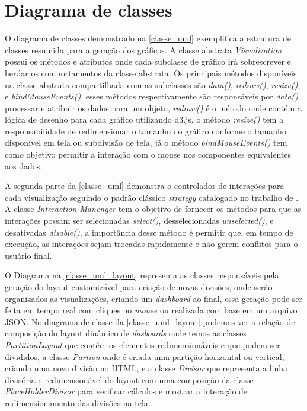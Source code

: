 \documentclass[
	12pt,				%
	openright,			%
	oneside,			%
	a4paper,			%
	english,			%
	brazil				%
	]{abntex2}
\begin{document}
\section{Diagrama de classes}
O diagrama de classes demonstrado na \autoref{classe_uml} exemplifica a estrutura de classes resumida para a geração dos gráficos. A classe abstrata \textit{Visualization}  possui os métodos e atributos onde cada subclasse de gráfico irá sobrescrever e herdar os comportamentos da classe abstrata. Os principais métodos disponíveis na classe abstrata compartilhada com as subclasses são  \textit{data()},  \textit{redraw()},  \textit{resize()}, e \textit{bindMouseEvents()}, esses métodos respectivamente são responsáveis por \textit{data()} processar e atribuir os dados para um objeto, \textit{redraw()} é o método onde contém a lógica de desenho para cada gráfico utilizando d3.js, o método \textit{resize()} tem a responsabilidade de redimensionar o tamanho do gráfico conforme o tamanho disponível em tela ou subdivisão de tela, já o método \textit{bindMouseEvents()} tem como objetivo permitir a interação com o mouse nos componentes equivalentes aos dados.

A segunda parte da \autoref{classe_uml} demonstra o controlador de interações para cada visualização seguindo o padrão clássico \textit{strategy} catalogado no trabalho de \cite{gamma1995design}. A classe \textit{Interaction Manenger} tem o objetivo de fornecer os métodos para que as interações possam ser selecionadas \textit{select()}, desselecionadas \textit{unselected()}, e desativadas \textit{disable()}, a importância desse método é permitir que, em tempo de execução, as interações sejam trocadas rapidamente e não gerem conflitos para o usuário final.

O Diagrama na \autoref{classe_uml_layout}  representa as classes responsáveis pela geração do layout customizável para criação de novas divisões, onde serão organizados as visualizações, criando um \textit{dashboard} ao final, essa geração pode ser feita em tempo real com cliques no \textit{mouse} ou realizada com base em um arquivo JSON. No diagrama de classe da \autoref{classe_uml_layout} podemos ver a relação de composição do layout dinâmico de \textit{dasboards} onde temos as classes \textit{PartitionLayout} que contém os elementos redimensionáveis e que podem ser divididos, a classe \textit{Partion} onde é criada uma partição horizontal ou vertical, criando uma nova divisão no HTML, e a classe \textit{Divisor} que representa a linha divisória e redimensionável do layout com uma composição da classe \textit{PlaceHolderDivisor} para verificar cálculos e mostrar a interação de redimensionamento das divisões na tela.
\end{document}
